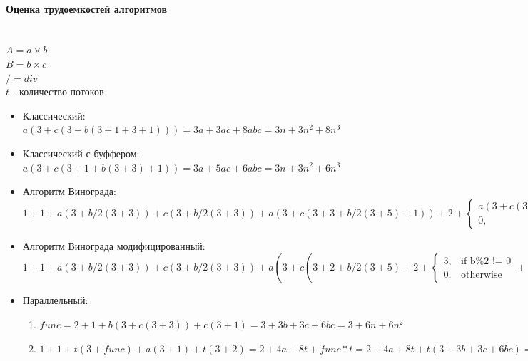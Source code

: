 \documentclass[utf8x, 12pt]{G7-32} %
\begin{document}
\paragraph{Оценка трудоемкостей алгоритмов}
\\$A = a\times b$\\$B = b\times c$\\$/ = div$\\$t$ - количество потоков
\begin{itemize}
	\item Классический: $a(3 + c(3 + b(3 + 1 + 3 + 1))) = 3a + 3ac + 8abc = 3n + 3n^2 + 8n^3$
	\item Классический с буффером: $a(3 + c(3 + 1 + b(3 + 3) + 1)) = 3a + 5ac + 6abc = 3n + 3n^2 + 6n^3$
	\item Алгоритм Винограда: $1 + 1 + a(3 + b/2(3 + 3)) + c(3 + b/2(3 + 3)) + a(3 + c(3 + 3 + b/2(3 + 5) + 1)) + 2 + \begin{cases} a(3 + c(3 + 1 + 3 + 1)),& \text{if b\%2 != 0}\\0,& \text{otherwise}\end{cases} = 4 + 6a + 3c + 3ab + 7ac + 3bc + 4abc + \begin{cases} 3a + 8ac,& \text{if b\%2 != 0}\\0,& \text{otherwise}\end{cases} = 4 + 9n + 13n^2 + 4n^3 + \begin{cases} 3n + 8n^2,& \text{if b\%2 != 0}\\0,& \text{otherwise}\end{cases}$
	\item Алгоритм Винограда модифицированный: $1 + 1 + a(3 + b/2(3 + 3)) + c(3 + b/2(3 + 3)) + a(3 + c(3 + 2 + b/2(3 + 5) + 2 + \begin{cases} 3,& \text{if b\%2 != 0}\\0,& \text{otherwise}\end{cases} + 1)) = 2 + 6a + 3c + 3ab + \begin{cases} 11ac,& \text{if b\%2 != 0}\\8ac,& \text{otherwise}\end{cases} + 3bc + 4abc = 2 + 9n + \begin{cases} 17n^2,& \text{if b\%2 != 0}\\14n^2,& \text{otherwise}\end{cases} + 4n^3$
	\item Параллельный:
	\begin{enumerate}
		\item $func = 2 + 1 + b(3 + c(3 + 3)) + c(3 + 1) = 3 + 3b + 3c + 6bc = 3 + 6n + 6n^2$
		\item $1 + 1 + t(3 + func) + a(3 + 1) + t(3 + 2) = 2 + 4a + 8t + func*t = 2 + 4a + 8t + t(3 + 3b + 3c + 6bc) = 2 + 4a + 11t + 3bt + 3ct + 6bct = 2 + 4n + 11t + 3nt + 3nt + 6n^2t$
	\end{enumerate}
\end{itemize}
\end{document}
